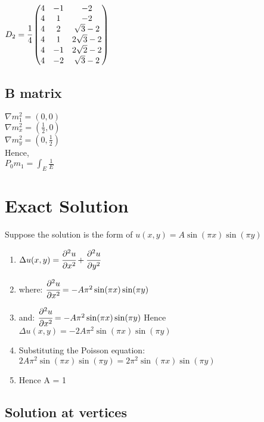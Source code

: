 \documentclass{article}
\begin{document}
$D_2 = \cfrac{1}{4}\begin{pmatrix}
    4 & -1 & - 2\\
    4 & 1 & - 2\\
    4 & 2 & \sqrt{3} - 2\\
    4 & 1 & 2\sqrt{3} - 2\\
    4 & -1 & 2\sqrt{2} - 2\\
    4 & -2 & \sqrt{3} - 2\\
\end{pmatrix}$

\subsection{B matrix}
$\nabla m_1^2 = (0,0)$\\
$\nabla m_x^2 = (\frac{1}{2},0)$ \\
$\nabla m_y^2 = (0,\frac{1}{2})$ \\

Hence, \\
$P_0m_1 = \int_E\frac{1}{E}$




\section{Exact Solution}

Suppose the solution is the form of $u(x,y) = A\sin(\pi x)\sin(\pi y)$\\
\begin{enumerate}
    \item $\Delta u(x,y) = \cfrac{\partial^2 u}{\partial x^2} + \cfrac{\partial^2 u}{\partial y^2}$
    \item where: $\cfrac{\partial^2 u}{\partial x^2} = -A\pi^2\sin(\pi x)\sin(\pi y)$
    \item and: $\cfrac{\partial^2 u}{\partial x^2} = -A\pi^2\sin(\pi x)\sin(\pi y)$
    Hence $\Delta u(x,y) = -2A\pi^2\sin(\pi x)\sin(\pi y)$
    \item Substituting the Poisson equation: $2A\pi^2\sin(\pi x)\sin(\pi y) = 2\pi^2\sin(\pi x)\sin(\pi y)$
    \item Hence A = 1
\end{enumerate}

\subsection{Solution at vertices}
\end{document}
